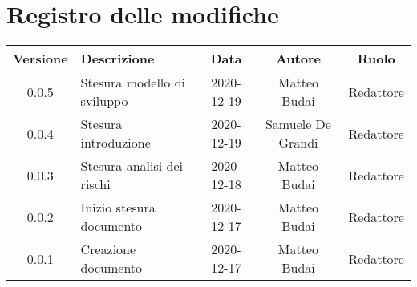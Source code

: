 \section*{Registro delle modifiche}

\begin{center}
	\begin{longtable}{|c|p{5cm}|c|c|c|}
	\hline
	\rowcolor{lighter-grayer}
	\textbf{Versione} & \textbf{Descrizione} & \textbf{Data} & \textbf{Autore} & \textbf{Ruolo} \\
	\hline
	\endfirsthead

	0.0.5 & Stesura modello di sviluppo & 2020-12-19 & Matteo Budai & Redattore \\
	\hline
	0.0.4 & Stesura introduzione & 2020-12-19 & Samuele De Grandi & Redattore \\
	\hline
	0.0.3 & Stesura analisi dei rischi & 2020-12-18 & Matteo Budai & Redattore \\
	\hline
	0.0.2 & Inizio stesura documento & 2020-12-17 & Matteo Budai & Redattore \\
	\hline
	0.0.1 & Creazione documento & 2020-12-17 & Matteo Budai & Redattore \\
	\hline

	\end{longtable}
\end{center}